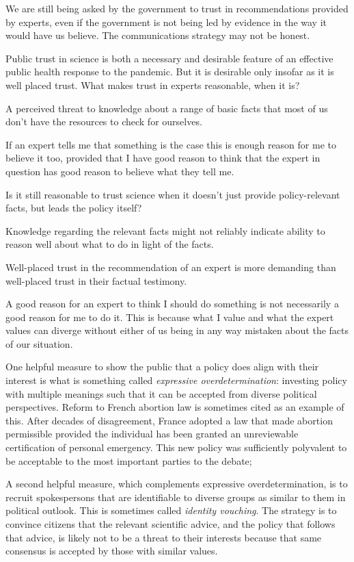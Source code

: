 \documentclass[
]{book}
\begin{document}
We are still being asked by the government to trust in recommendations provided by experts, even if the government is not being led by evidence in the way it would have us believe.
The communications strategy may not be honest.

Public trust in science is both a necessary and desirable feature of an effective public health response to the pandemic. But it is desirable only insofar as it is well placed trust.
What makes trust in experts reasonable, when it is?

A perceived threat to knowledge about a range of basic facts that most of us don't have the resources to check for ourselves.

If an expert tells me that something is the case this is enough reason for me to believe it too, provided that I have good reason to think that the expert in question has good reason to believe what they tell me.

Is it still reasonable to trust science when it doesn't just provide policy-relevant facts, but leads the policy itself?

Knowledge regarding the relevant facts might not reliably indicate ability to reason well about what to do in light of the facts.

Well-placed trust in the recommendation of an expert is more demanding than well-placed trust in their factual testimony.

A good reason for an expert to think I should do something is not necessarily a good reason for me to do it.
This is because what I value and what the expert values can diverge without either of us being in any way mistaken about the facts of our situation.

One helpful measure to show the public that a policy does align with their interest is what is something called \emph{expressive overdetermination}: investing policy with multiple meanings such that it can be accepted from diverse political perspectives. Reform to French abortion law is sometimes cited as an example of this. After decades of disagreement, France adopted a law that made abortion permissible provided the individual has been granted an unreviewable certification of personal emergency. This new policy was sufficiently polyvalent to be acceptable to the most important parties to the debate;

A second helpful measure, which complements expressive overdetermination, is to recruit spokespersons that are identifiable to diverse groups as similar to them in political outlook. This is sometimes called \emph{identity vouching}. The strategy is to convince citizens that the relevant scientific advice, and the policy that follows that advice, is likely not to be a threat to their interests because that same consensus is accepted by those with similar values.
\end{document}
